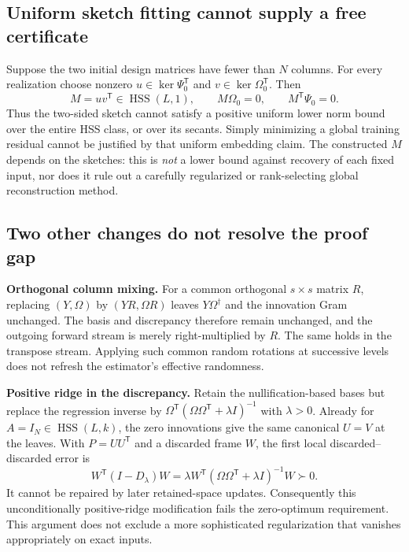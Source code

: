 \documentclass[11pt,oneside,openany,a4paper]{book}
\numberwithin{equation}{chapter}
\theoremstyle{definition}
\theoremstyle{remark}
\newcommand{\T}{\mathsf T}\newcommand{\Id}{I}
\DeclareMathOperator{\HSS}{HSS}\DeclareMathOperator{\dist}{dist}
\begin{document}
\subsection{Uniform sketch fitting cannot supply a free certificate}
Suppose the two initial design matrices have fewer than $N$ columns.
For every realization choose nonzero
$u\in\ker\Psi_0^{\T}$ and $v\in\ker\Omega_0^{\T}$. Then
\[
 M=uv^{\T}\in\HSS(L,1),\qquad
 M\Omega_0=0,\qquad M^{\T}\Psi_0=0.
\]
Thus the two-sided sketch cannot satisfy a positive uniform lower norm
bound over the entire HSS class, or over its secants. Simply minimizing a
global training residual cannot be justified by that uniform embedding
claim. The constructed $M$ depends on the sketches: this is \emph{not} a
lower bound against recovery of each fixed input, nor does it rule out a
carefully regularized or rank-selecting global reconstruction method.

\subsection{Two other changes do not resolve the proof gap}
\textbf{Orthogonal column mixing.} For a common orthogonal $s\times s$
matrix $R$, replacing $(Y,\Omega)$ by $(YR,\Omega R)$ leaves
$Y\Omega^\dagger$ and the innovation Gram unchanged. The basis and
discrepancy therefore remain unchanged, and the outgoing forward stream
is merely right-multiplied by $R$. The same holds in the transpose stream.
Applying such common random rotations at successive levels does not
refresh the estimator's effective randomness.

\textbf{Positive ridge in the discrepancy.} Retain the nullification-based
bases but replace the regression inverse by
$\Omega^{\T}(\Omega\Omega^{\T}+\lambda I)^{-1}$ with $\lambda>0$.
Already for $A=I_N\in\HSS(L,k)$, the zero innovations give the same
canonical $U=V$ at the leaves. With $P=UU^{\T}$ and a discarded frame
$W$, the first local discarded--discarded error is
\[
 W^{\T}(I-D_\lambda)W
 =\lambda W^{\T}(\Omega\Omega^{\T}+\lambda I)^{-1}W\succ0.
\]
It cannot be repaired by later retained-space updates. Consequently this
unconditionally positive-ridge modification fails the zero-optimum
requirement. This argument does not exclude a more sophisticated
regularization that vanishes appropriately on exact inputs.


\endgroup
\end{document}
